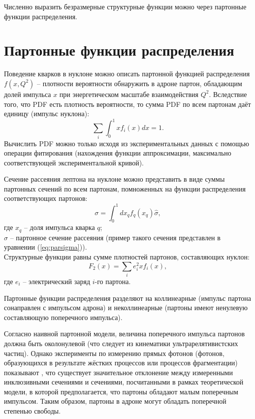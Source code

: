 \documentclass{extreport}
\begin{document}
Численно выразить безразмерные структурные функции можно через партонные функции распределения.

\section{Партонные функции распределения}
Поведение кварков в нуклоне можно описать партонной функцией распределения $f(x,Q^2)$ – плотности вероятности обнаружить в адроне партон, обладающим долей импульса $x$ при энергетическом масштабе взаимодействия $Q^2$. Вследствие того, что PDF есть плотность вероятности, то сумма PDF по всем партонам даёт единицу (импульс нуклона):
\begin{equation}
	\sum_i \int_0^1 x f_i(x)dx = 1.
\end{equation}
Вычислить PDF можно только исходя из экспериментальных данных с помощью операции фитирования (нахождения функции аппроксимации, максимально соответствующей экспериментальной кривой). 

Сечение рассеяния лептона на нуклоне можно представить в виде суммы партонных сечений по всем партонам, помноженных на функции распределения соответствующих партонов:
\begin{equation}
	\sigma = \int_0^1 dx_q f_q(x_q) \hat{\sigma},
\end{equation}
где $x_q$ -- доля импульса кварка $q$; \\ $\hat{\sigma}$ -- партонное сечение рассеяния (пример такого сечения представлен в уравнении (\ref{eq:parsigma})).\\
Структурные функции равны сумме плотностей партонов, составляющих нуклон:
\begin{equation}
	F_2(x) = \sum_i e^2_i x f_i(x),
\end{equation}
где $e_i$ -- электрический заряд $i$-го партона.


Партонные функции распределения разделяют на коллинеарные (импульс партона сонаправлен с импульсом адрона) и неколлинеарные (партоны имеют ненулевую составляющую поперечного импульса).


Согласно наивной партонной модели, величина поперечного импульса партонов должна быть околонулевой (что следует из кинематики ультрарелятивистских частиц). Однако эксперименты по измерению прямых фотонов (фотонов, образующихся в результате жёстких процессов или процессов фрагментации) показывают \cite{Adams_1995}, что существует значительное отклонение между измеренными инклюзивными сечениями и сечениями, посчитанными в рамках теоретической модели, в которой предполагается, что партоны обладают малым поперечным импульсом. Таким образом, партоны в адроне могут обладать поперечной степенью свободы. 
\end{document}
